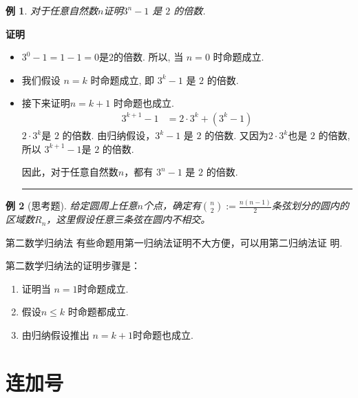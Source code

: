 \documentclass[13pt,fontset=mac]{ctexbeamer}
\newtheorem{exa}{例}
\def\qed{\nopagebreak\hfill{\rule{4pt}{7pt}}\medbreak}
\def\pf{{\bf 证明~~ }}
\begin{document}
\begin{frame}
\begin{exa}
对于任意自然数$n$证明$3^n−1$ 是 $2$ 的倍数.
\end{exa}
\pf 

\begin{itemize}
	\item  $3^0−1 = 1−1 = 0$是$ 2 $的倍数.  所以, 当 $n=0$ 时命题成立. 
	\item 我们假设 $n=k$ 时命题成立, 即 $3^{k}−1$ 是 $2$ 的倍数.
	\item 接下来证明$n=k+1$ 时命题也成立. 
	\begin{align*}
		3^{k+1}-1 & = 2 \cdot 3^{k}+(3^{k}-1 )
	\end{align*}
	$2 \cdot 3^{k}$是 $2$ 的倍数.
	由归纳假设，$3^{k}−1$ 是 $2$ 的倍数.
	又因为$2 \cdot 3^{k}$也是 $2$ 的倍数, 
	所以	$3^{k+1}-1$是 $2$ 的倍数.
	
	因此，对于任意自然数$n$，都有 $3^n−1$ 是 $2$ 的倍数.
	 \qed
\end{itemize}
\end{frame}

\begin{frame}
	\begin{exa}[思考题]
给定圆周上任意$n$个点，确定有$\binom{n}{2}:=\frac{n(n-1)}{2}$条弦划分的圆内的区域数$R_n$，这里假设任意三条弦在圆内不相交。
	\end{exa}




\end{frame}

\begin{frame}{第二数学归纳法}
有些命题用第一归纳法证明不大方便，可以用第二归纳法证
明. 

第二数学归纳法的证明步骤是：
\begin{enumerate}
\item 证明当 $n=1$时命题成立.
\item 假设$n\le k$ 时命题都成立.
\item 由归纳假设推出 $n=k+1$时命题也成立.
\end{enumerate}
\end{frame}






\section{连加号}
\end{document}
